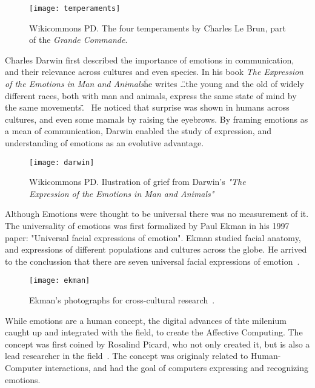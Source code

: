 \begin{figure}[H]
  \texttt{[image: temperaments]}
  \centering
  \caption{Wikicommons PD. The four temperaments by Charles Le Brun, part of the \emph{Grande Commande}.}
\end{figure}\label{fig:temperaments}

Charles Darwin first described the importance of emotions in communication, and their relevance across cultures and even species. In his book \"\emph{The Expression of the Emotions in Man and Animals}\" he writes \"\ldots the young and the old of widely different races, both with man and animals, express the same state of mind by the same movements.\"~\cite{darwin1872emotions} He noticed that surprise was shown in humans across cultures, and even some mamals by raising the eyebrows. By framing emotions as a mean of communication, Darwin enabled the study of expression, and understanding of emotions as an evolutive advantage.

\begin{figure}[H]
  \texttt{[image: darwin]}
  \centering
  \caption{Wikicommons PD. Ilustration of grief from Darwin's \emph{"The Expression of the Emotions in Man and Animals"}}
\end{figure}\label{fig:darwin}

Although Emotions were thought to be universal there was no measurement of it. The universality of emotions was first formalized by Paul Ekman in his 1997 paper: "Universal facial expressions of emotion". Ekman studied facial anatomy, and expressions of different populations and cultures across the globe. He arrived to the conclussion that there are seven universal facial expressions of emotion~\cite{ekman1997universal}.

\begin{figure}[H]
  \texttt{[image: ekman]}
  \centering
  \caption{Ekman's photographs for cross-cultural research~\cite{ekman1999facial}.}
\end{figure}\label{fig:darwin}

While emotions are a human concept, the digital advances of thte milenium caught up and integrated with the field, to create the Affective Computing. The concept was first coined by Rosalind Picard, who not only created it, but is also a lead researcher in the field~\cite{picard2000affective}. The concept was originaly related to Human-Computer interactions, and had the goal of computers expressing and recognizing emotions.

